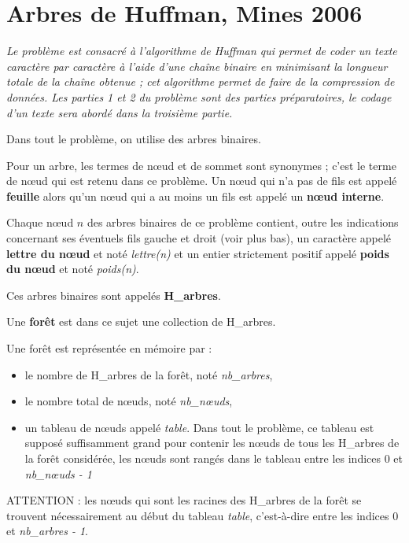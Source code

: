 \section{Arbres de Huffman, Mines 2006}

{\it Le problème est consacré à l’algorithme de Huffman qui permet de coder un texte caractère par
caractère à l’aide d’une chaîne binaire en minimisant la longueur totale de la chaîne obtenue ; cet algorithme
permet de faire de la compression de données. Les parties 1 et 2 du problème sont des parties préparatoires, le
codage d’un texte sera abordé dans la troisième partie.}

\medskip


Dans tout le problème, on utilise des arbres binaires. 

Pour un arbre, les termes de nœud et de sommet sont
synonymes ; c’est le terme de nœud qui est retenu dans ce problème. Un nœud qui n’a pas de fils est appelé
{\bf feuille} alors qu’un nœud qui a au moins un fils est appelé un {\bf nœud interne}.

Chaque nœud $n$ des arbres binaires de ce problème contient, outre les indications concernant ses éventuels
fils gauche et droit (voir plus bas), un caractère appelé {\bf lettre du nœud} et noté {\it lettre(n)} et un entier strictement positif appelé {\bf poids du nœud} et noté {\it poids(n)}. 

Ces arbres binaires sont appelés {\bf H\_arbres}.

Une {\bf forêt} est dans ce sujet une collection de H\_arbres.

Une forêt est représentée en mémoire par :
\begin{itemize}
  \item le nombre de H\_arbres de la forêt, noté {\it nb\_arbres},
  \item le nombre total de nœuds, noté {\it nb\_nœuds},
  \item un tableau de nœuds appelé {\it table}. Dans tout le problème, ce tableau est supposé
suffisamment grand pour contenir les nœuds de tous les H\_arbres de la forêt considérée, les nœuds sont
rangés dans le tableau entre les indices 0 et {\it nb\_nœuds - 1}
\end{itemize}
ATTENTION : les nœuds qui sont les racines des H\_arbres de la forêt se trouvent nécessairement au début du tableau {\it table}, c’est-à-dire entre les indices 0 et {\it nb\_arbres - 1}. 


